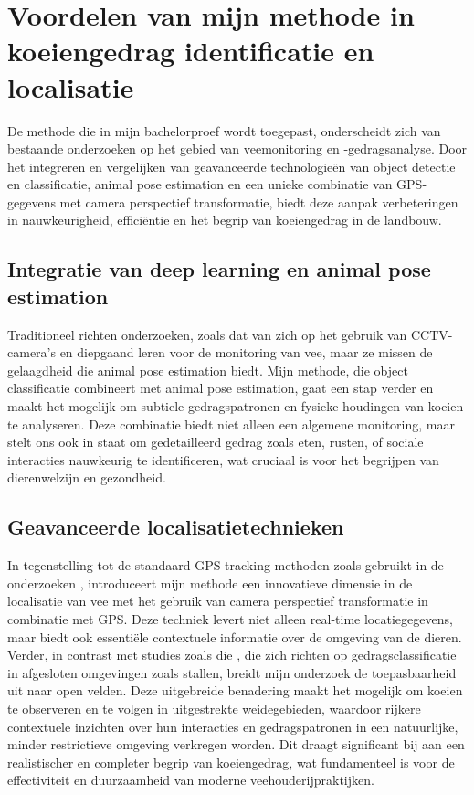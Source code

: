 \section{Voordelen van mijn methode in koeiengedrag identificatie en localisatie}
De methode die in mijn bachelorproef wordt toegepast, onderscheidt zich van bestaande onderzoeken op het gebied van veemonitoring en -gedragsanalyse. 
Door het integreren en vergelijken van geavanceerde technologieën van object detectie en classificatie, animal pose estimation en een unieke combinatie van GPS-gegevens met camera perspectief transformatie, biedt deze aanpak verbeteringen in nauwkeurigheid, efficiëntie en het begrip van koeiengedrag in de landbouw.
\subsection{Integratie van deep learning en animal pose estimation}
Traditioneel richten onderzoeken, zoals dat van \textcite{Fuentes2023} zich op het gebruik van CCTV-camera’s en diepgaand leren voor de monitoring van vee, maar ze missen de gelaagdheid die animal pose estimation biedt. 
Mijn methode, die object classificatie combineert met animal pose estimation, gaat een stap verder en maakt het mogelijk om subtiele gedragspatronen en fysieke houdingen van koeien te analyseren. 
Deze combinatie biedt niet alleen een algemene monitoring, maar stelt ons ook in staat om gedetailleerd gedrag zoals eten, rusten, of sociale interacties nauwkeurig te identificeren, wat cruciaal is voor het begrijpen van dierenwelzijn en gezondheid.
\subsection{Geavanceerde localisatietechnieken}
In tegenstelling tot de standaard GPS-tracking methoden zoals gebruikt in de onderzoeken \textcite{halachmi2019smart}, introduceert mijn methode een innovatieve dimensie in de localisatie van vee met het gebruik van camera perspectief transformatie in combinatie met GPS. 
Deze techniek levert niet alleen real-time locatiegegevens, maar biedt ook essentiële contextuele informatie over de omgeving van de dieren. Verder, in contrast met studies zoals die \textcite{Fuentes2023}, die zich richten op gedragsclassificatie in afgesloten omgevingen zoals stallen, breidt mijn onderzoek de toepasbaarheid uit naar open velden. Deze uitgebreide benadering maakt het mogelijk om koeien te observeren en te volgen in uitgestrekte weidegebieden, waardoor rijkere contextuele inzichten over hun interacties en gedragspatronen in een natuurlijke, minder restrictieve omgeving verkregen worden. 
Dit draagt significant bij aan een realistischer en completer begrip van koeiengedrag, wat fundamenteel is voor de effectiviteit en duurzaamheid van moderne veehouderijpraktijken.
